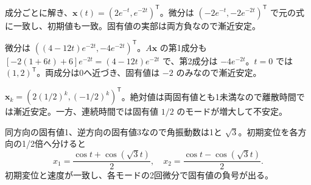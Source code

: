 \documentclass[11pt]{article}
\begin{document}

\problem[対角系の時間応答]
\begin{ans}
成分ごとに解き、$\boldsymbol x(t)=(2e^{-t},e^{-2t})^{\mathsf T}$。微分は $(-2e^{-t},-2e^{-2t})^{\mathsf T}$ で元の式に一致し、初期値も一致。固有値の実部は両方負なので漸近安定。
\end{ans}

\problem[対角化できない減衰系]
\begin{ans}
微分は $((4-12t)e^{-2t},-4e^{-2t})^{\mathsf T}$。$A\boldsymbol x$ の第1成分も $[-2(1+6t)+6]e^{-2t}=(4-12t)e^{-2t}$ で、第2成分は $-4e^{-2t}$。$t=0$ では $(1,2)^{\mathsf T}$。両成分は0へ近づき、固有値は $-2$ のみなので漸近安定。
\end{ans}
\newpage

\problem[離散時間]
\begin{ans}
$\boldsymbol x_k=(2(1/2)^k,(-1/2)^k)^{\mathsf T}$。絶対値は両固有値とも1未満なので離散時間では漸近安定。一方、連続時間では固有値 $1/2$ のモードが増大して不安定。
\end{ans}

\problem[結合振動]
\begin{ans}
同方向の固有値1、逆方向の固有値3なので角振動数は1と $\sqrt3$。初期変位を各方向の1/2倍へ分けると \[x_1=\frac{\cos t+\cos(\sqrt3t)}2,\quad x_2=\frac{\cos t-\cos(\sqrt3t)}2.\] 初期変位と速度が一致し、各モードの2回微分で固有値の負号が出る。
\end{ans}
\end{document}
